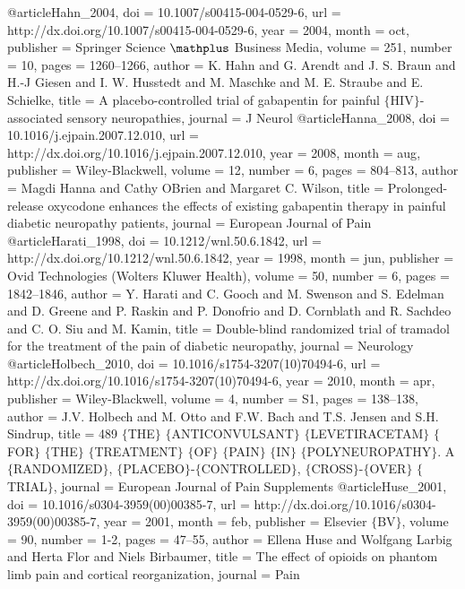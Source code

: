 @article{Hahn_2004,
	doi = {10.1007/s00415-004-0529-6},
	url = {http://dx.doi.org/10.1007/s00415-004-0529-6},
	year = 2004,
	month = {oct},
	publisher = {Springer Science $\mathplus$ Business Media},
	volume = {251},
	number = {10},
	pages = {1260--1266},
	author = {K. Hahn and G. Arendt and J. S. Braun and H.-J Giesen and I. W. Husstedt and M. Maschke and M. E. Straube and E. Schielke},
	title = {A placebo-controlled trial of gabapentin for painful $\lbrace$HIV$\rbrace$-associated sensory neuropathies},
	journal = {J Neurol}
}
@article{Hanna_2008,
	doi = {10.1016/j.ejpain.2007.12.010},
	url = {http://dx.doi.org/10.1016/j.ejpain.2007.12.010},
	year = 2008,
	month = {aug},
	publisher = {Wiley-Blackwell},
	volume = {12},
	number = {6},
	pages = {804--813},
	author = {Magdi Hanna and Cathy O{\textquotesingle}Brien and Margaret C. Wilson},
	title = {Prolonged-release oxycodone enhances the effects of existing gabapentin therapy in painful diabetic neuropathy patients},
	journal = {European Journal of Pain}
}
@article{Harati_1998,
	doi = {10.1212/wnl.50.6.1842},
	url = {http://dx.doi.org/10.1212/wnl.50.6.1842},
	year = 1998,
	month = {jun},
	publisher = {Ovid Technologies (Wolters Kluwer Health)},
	volume = {50},
	number = {6},
	pages = {1842--1846},
	author = {Y. Harati and C. Gooch and M. Swenson and S. Edelman and D. Greene and P. Raskin and P. Donofrio and D. Cornblath and R. Sachdeo and C. O. Siu and M. Kamin},
	title = {Double-blind randomized trial of tramadol for the treatment of the pain of diabetic neuropathy},
	journal = {Neurology}
}
@article{Holbech_2010,
	doi = {10.1016/s1754-3207(10)70494-6},
	url = {http://dx.doi.org/10.1016/s1754-3207(10)70494-6},
	year = 2010,
	month = {apr},
	publisher = {Wiley-Blackwell},
	volume = {4},
	number = {S1},
	pages = {138--138},
	author = {J.V. Holbech and M. Otto and F.W. Bach and T.S. Jensen and S.H. Sindrup},
	title = {489 $\lbrace$THE$\rbrace$ $\lbrace$ANTICONVULSANT$\rbrace$ $\lbrace$LEVETIRACETAM$\rbrace$ $\lbrace$FOR$\rbrace$ $\lbrace$THE$\rbrace$ $\lbrace$TREATMENT$\rbrace$ $\lbrace$OF$\rbrace$ $\lbrace$PAIN$\rbrace$ $\lbrace$IN$\rbrace$ $\lbrace$POLYNEUROPATHY$\rbrace$. A $\lbrace$RANDOMIZED$\rbrace$, $\lbrace$PLACEBO$\rbrace$-$\lbrace$CONTROLLED$\rbrace$, $\lbrace$CROSS$\rbrace$-$\lbrace$OVER$\rbrace$ $\lbrace$TRIAL$\rbrace$},
	journal = {European Journal of Pain Supplements}
}
@article{Huse_2001,
	doi = {10.1016/s0304-3959(00)00385-7},
	url = {http://dx.doi.org/10.1016/s0304-3959(00)00385-7},
	year = 2001,
	month = {feb},
	publisher = {Elsevier $\lbrace$BV$\rbrace$},
	volume = {90},
	number = {1-2},
	pages = {47--55},
	author = {Ellena Huse and Wolfgang Larbig and Herta Flor and Niels Birbaumer},
	title = {The effect of opioids on phantom limb pain and cortical reorganization},
	journal = {Pain}
}
